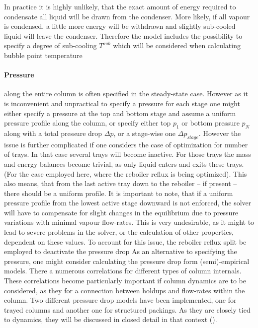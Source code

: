         In practice it is highly unlikely, that the exact amount of energy required to condensate all
        liquid will be drawn from the condenser. More likely, if all vapour is condensed, a little more
        energy will be withdrawn and slightly sub-cooled liquid will leave the condenser. Therefore
        the model includes the possibility to specify a degree of sub-cooling $T^{sub}$ which will be
        considered when calculating bubble point temperature
        \paragraph{Pressure} along the entire column is often specified in the steady-state case.
        However as it is inconvenient and unpractical to specify a pressure for each stage one might either specify
        a pressure at the top and bottom stage and assume a uniform pressure profile along the column, or
        specify either top $p_1$ or bottom pressure $p_N$ along with a total pressure drop $\Delta p$,
        or a stage-wise one $\Delta p_{stage}$. However the issue is further complicated if one considers the
        case of optimization for number of trays. In that case several trays will become inactive. For those
        trays the mass and energy balances become trivial, as only liquid enters and exits these trays.
        (For the case employed here, where the reboiler reflux is being optimized). This also means,
        that from the last active tray down to the reboiler -- if present -- there should be a uniform
        profile. It is important to note, that if a uniform pressure profile from the lowest active stage 
        downward is not enforced, the solver will have to compensate for slight changes in the equilibrium 
        due to pressure variations with minimal vapour flow-rates. This is very undesirable, as it might to 
        lead to severe problems in the solver, or the calculation of other properties, dependent on these values. 
        To account for this issue, the reboiler reflux split be employed to deactivate the pressure drop
        As an alternative to specifying the pressure, one might consider calculating the pressure drop
        form (semi)-empirical models. There a numerous correlations for different types of column internals.
        These correlations become particularly important if column dynamics are to be considered, as they
        for a connection between holdups and flow-rates within the column. Two different pressure drop models
        have been implemented, one for trayed columns and another one for structured packings. As they are closely
        tied to dynamics, they will be discussed in closed detail in that context ().

